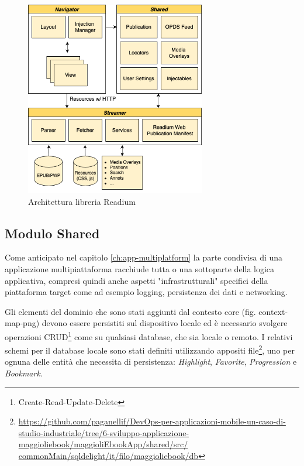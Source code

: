 \begin{figure}[H]
    \centering
    \includegraphics[width=0.7\textwidth]{img/readium-arch.png}
    \caption{Architettura libreria Readium}
    \label{readiumarch}
\end{figure}

\subsection{Modulo Shared}
Come anticipato nel capitolo \ref{ch:app-multiplatform} la parte condivisa di una applicazione multipiattaforma racchiude tutta o una sottoparte della logica applicativa, compresi quindi anche aspetti "infrastrutturali" specifici della piattaforma target come ad esempio logging, persistenza dei dati e networking.

Gli elementi del dominio che sono stati aggiunti dal contesto core (fig. context-map-png) devono essere persistiti sul dispositivo locale ed è necessario svolgere operazioni CRUD\footnote{Create-Read-Update-Delete} come su qualsiasi database, che sia locale o remoto. I relativi schemi per il database locale sono stati definiti utilizzando appositi file\footnote{\href{https://github.com/paganellif/DevOps-per-applicazioni-mobile-un-caso-di-studio-industriale/tree/6-sviluppo-applicazione-maggioliebook/maggioliEbookApp/shared/src/commonMain/sqldelight/it/filo/maggioliebook/db}{https://github.com/paganellif/DevOps-per-applicazioni-mobile-un-caso-di-studio-industriale/tree/6-sviluppo-applicazione-maggioliebook/maggioliEbookApp/shared/src/\\commonMain/sqldelight/it/filo/maggioliebook/db}}, uno per ognuna delle entità che necessita di persistenza: \textit{Highlight}, \textit{Favorite}, \textit{Progression} e \textit{Bookmark}.

